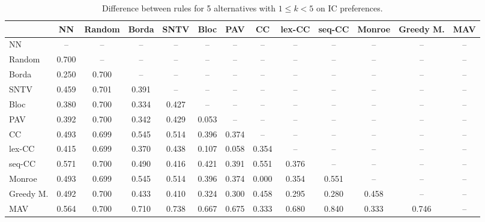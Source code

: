
\begin{table*}[htbp]
\centering
\begin{tabular}{lcccccccccccc}
\toprule
 & NN & Random & Borda & SNTV & Bloc & PAV & CC & lex-CC & seq-CC & Monroe & Greedy M. & MAV \\
\midrule
NN & -- & -- & -- & -- & -- & -- & -- & -- & -- & -- & -- & -- \\
Random & \cellcolor{blue!70} 0.700 & -- & -- & -- & -- & -- & -- & -- & -- & -- & -- & -- \\
Borda & \cellcolor{blue!25} 0.250 & \cellcolor{blue!70} 0.700 & -- & -- & -- & -- & -- & -- & -- & -- & -- & -- \\
SNTV & \cellcolor{blue!45} 0.459 & \cellcolor{blue!70} 0.701 & \cellcolor{blue!39} 0.391 & -- & -- & -- & -- & -- & -- & -- & -- & -- \\
Bloc & \cellcolor{blue!38} 0.380 & \cellcolor{blue!70} 0.700 & \cellcolor{blue!33} 0.334 & \cellcolor{blue!42} 0.427 & -- & -- & -- & -- & -- & -- & -- & -- \\
PAV & \cellcolor{blue!39} 0.392 & \cellcolor{blue!70} 0.700 & \cellcolor{blue!34} 0.342 & \cellcolor{blue!42} 0.429 & \cellcolor{blue!5} 0.053 & -- & -- & -- & -- & -- & -- & -- \\
CC & \cellcolor{blue!49} 0.493 & \cellcolor{blue!69} 0.699 & \cellcolor{blue!54} 0.545 & \cellcolor{blue!51} 0.514 & \cellcolor{blue!39} 0.396 & \cellcolor{blue!37} 0.374 & -- & -- & -- & -- & -- & -- \\
lex-CC & \cellcolor{blue!41} 0.415 & \cellcolor{blue!69} 0.699 & \cellcolor{blue!37} 0.370 & \cellcolor{blue!43} 0.438 & \cellcolor{blue!10} 0.107 & \cellcolor{blue!5} 0.058 & \cellcolor{blue!35} 0.354 & -- & -- & -- & -- & -- \\
seq-CC & \cellcolor{blue!57} 0.571 & \cellcolor{blue!70} 0.700 & \cellcolor{blue!49} 0.490 & \cellcolor{blue!41} 0.416 & \cellcolor{blue!42} 0.421 & \cellcolor{blue!39} 0.391 & \cellcolor{blue!55} 0.551 & \cellcolor{blue!37} 0.376 & -- & -- & -- & -- \\
Monroe & \cellcolor{blue!49} 0.493 & \cellcolor{blue!69} 0.699 & \cellcolor{blue!54} 0.545 & \cellcolor{blue!51} 0.514 & \cellcolor{blue!39} 0.396 & \cellcolor{blue!37} 0.374 & \cellcolor{blue!0} 0.000 & \cellcolor{blue!35} 0.354 & \cellcolor{blue!55} 0.551 & -- & -- & -- \\
Greedy M. & \cellcolor{blue!49} 0.492 & \cellcolor{blue!70} 0.700 & \cellcolor{blue!43} 0.433 & \cellcolor{blue!41} 0.410 & \cellcolor{blue!32} 0.324 & \cellcolor{blue!30} 0.300 & \cellcolor{blue!45} 0.458 & \cellcolor{blue!29} 0.295 & \cellcolor{blue!28} 0.280 & \cellcolor{blue!45} 0.458 & -- & -- \\
MAV & \cellcolor{blue!56} 0.564 & \cellcolor{blue!70} 0.700 & \cellcolor{blue!71} 0.710 & \cellcolor{blue!73} 0.738 & \cellcolor{blue!66} 0.667 & \cellcolor{blue!67} 0.675 & \cellcolor{blue!33} 0.333 & \cellcolor{blue!68} 0.680 & \cellcolor{blue!84} 0.840 & \cellcolor{blue!33} 0.333 & \cellcolor{blue!74} 0.746 & -- \\
\bottomrule
\end{tabular}

\caption{Difference between rules for 5 alternatives with $1 \leq k < 5$ on IC preferences.}
\label{tab:rule_distance_heatmap-m=[5]-pref_dist=IC}
\end{table*}
    
